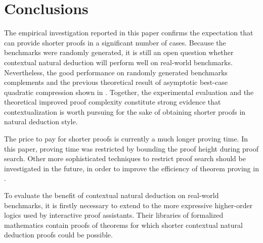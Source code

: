 \documentclass{llncs}
\begin{document}
\section{Conclusions}

The empirical investigation reported in this paper confirms the expectation that {\NDd} can provide shorter proofs in a significant number of cases. Because the benchmarks were randomly generated, it is still an open question whether contextual natural deduction will perform well on real-world benchmarks. Nevertheless, the good performance on randomly generated benchmarks complements and the previous theoretical result of asymptotic best-case quadratic compression shown in \cite{NDc}. Together, the experimental evaluation and the theoretical improved proof complexity constitute strong evidence that contextualization is worth pursuing for the sake of obtaining shorter proofs in natural deduction style. 

The price to pay for shorter proofs is currently a much longer proving time. In this paper, proving time was restricted by bounding the proof height during proof search. Other more sophisticated techniques to restrict proof search should be investigated in the future, in order to improve the efficiency of theorem proving in {\NDd}.

To evaluate the benefit of contextual natural deduction on real-world benchmarks, it is firstly necessary to extend {\NDd} to the more expressive higher-order logics used by interactive proof assistants. Their libraries of formalized mathematics contain proofs of theorems for which shorter contextual natural deduction proofs could be possible. 




\end{document}

